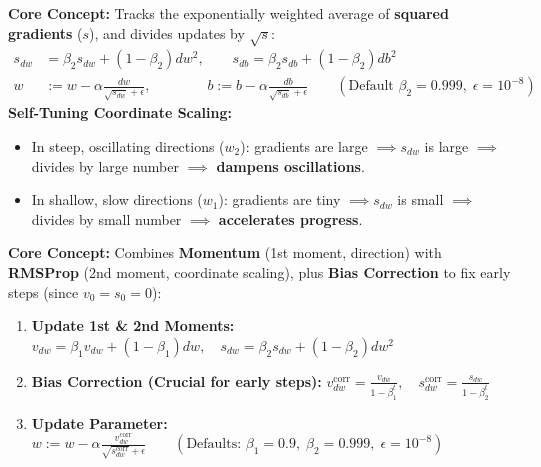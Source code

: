 \documentclass[10pt,a4paper]{article}
\begin{document}
\begin{tcolorbox}[
    colframe=accentred, colback=white, coltitle=white,
    fonttitle=\bfseries\sffamily\small,
    title={2. RMSProp: Root Mean Square Propagation (Geoffrey Hinton)},
    arc=1.3mm, boxrule=0.5pt, left=5pt, right=5pt, top=2pt, bottom=2pt
]
\footnotesize
\textbf{Core Concept:} Tracks the exponentially weighted average of \textbf{squared gradients} ($s$), and divides updates by $\sqrt{s}$:
\begin{align*}
s_{dw} &= \beta_2 s_{dw} + (1 - \beta_2) dw^2, \qquad s_{db} = \beta_2 s_{db} + (1 - \beta_2) db^2 \\[1.5pt]
w &:= w - \alpha \frac{dw}{\sqrt{s_{dw}} + \epsilon}, \qquad\qquad b := b - \alpha \frac{db}{\sqrt{s_{db}} + \epsilon} \qquad (\text{Default } \beta_2 = 0.999, \; \epsilon = 10^{-8})
\end{align*}
\textbf{Self-Tuning Coordinate Scaling:}
\begin{itemize}[leftmargin=8pt, itemsep=0.5pt, topsep=0pt]
    \item In steep, oscillating directions ($w_2$): gradients are large $\implies s_{dw}$ is large $\implies$ divides by large number $\implies$ \textbf{dampens oscillations}.
    \item In shallow, slow directions ($w_1$): gradients are tiny $\implies s_{dw}$ is small $\implies$ divides by small number $\implies$ \textbf{accelerates progress}.
\end{itemize}
\end{tcolorbox}

\vspace{-2pt}

\begin{tcolorbox}[
    colframe=accentgreen, colback=white, coltitle=white,
    fonttitle=\bfseries\sffamily\small,
    title={3. Adam: Adaptive Moment Estimation (Kingma \& Ba 2015)},
    arc=1.3mm, boxrule=0.5pt, left=5pt, right=5pt, top=2pt, bottom=2pt
]
\footnotesize
\textbf{Core Concept:} Combines \textbf{Momentum} (1st moment, direction) with \textbf{RMSProp} (2nd moment, coordinate scaling), plus \textbf{Bias Correction} to fix early steps (since $v_0 = s_0 = 0$):
\begin{enumerate}[leftmargin=12pt, itemsep=1pt, topsep=0.5pt]
    \item \textbf{Update 1st \& 2nd Moments:} $v_{dw} = \beta_1 v_{dw} + (1 - \beta_1) dw, \quad s_{dw} = \beta_2 s_{dw} + (1 - \beta_2) dw^2$
    \item \textbf{Bias Correction (Crucial for early steps):} $v_{dw}^{\text{corr}} = \frac{v_{dw}}{1 - \beta_1^t}, \quad s_{dw}^{\text{corr}} = \frac{s_{dw}}{1 - \beta_2^t}$
    \item \textbf{Update Parameter:} $w := w - \alpha \frac{v_{dw}^{\text{corr}}}{\sqrt{s_{dw}^{\text{corr}}} + \epsilon} \qquad (\text{Defaults: } \beta_1 = 0.9, \; \beta_2 = 0.999, \; \epsilon = 10^{-8})$
\end{enumerate}
\end{tcolorbox}
\end{document}

